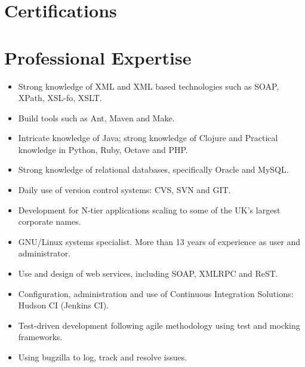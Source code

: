 \documentclass[a4paper,11pt]{moderncv}
\begin{document}
\section{Certifications}

\section{Professional Expertise}
\begin{itemize}
\item Strong knowledge of XML and XML based technologies such as SOAP, XPath, XSL-fo, XSLT.
\item Build tools such as Ant, Maven and Make.
\item Intricate knowledge of Java; strong knowledge of Clojure and Practical knowledge in Python, Ruby, Octave and PHP.
\item Strong knowledge of relational databases, specifically Oracle and MySQL.
\item Daily use of version control systems: CVS, SVN and GIT.
\item Development for N-tier applications scaling to some of the UK's largest corporate names.
\item GNU/Linux systems specialist. More than 13 years of experience as user
  and administrator.
\item Use and design of web services, including SOAP, XMLRPC and ReST.
\item Configuration, administration and use of Continuous Integration
Solutions: Hudson CI (Jenkins CI).
\item Test-driven development following agile methodology using test and mocking frameworks.
\item Using bugzilla to log, track and resolve issues.
\end{itemize}
\end{document}
